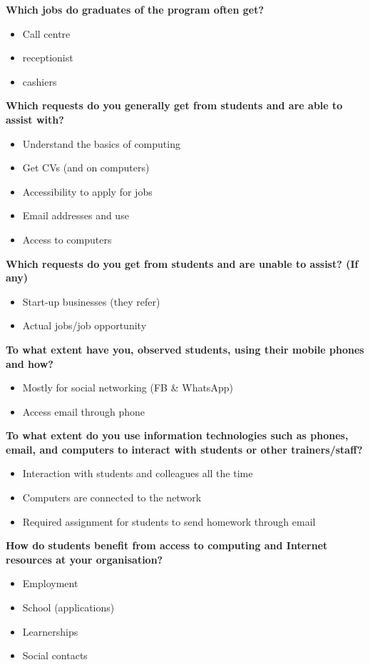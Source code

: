 

\noindent\textbf{Which jobs do graduates of the program often get?}
\begin{itemize}
\item Call centre
\item receptionist
\item cashiers
\end{itemize}

\noindent\textbf{Which requests do you generally get from students and are able to assist with?}
\begin{itemize}
\item Understand the basics of computing
\item Get CVs (and on computers)
\item Accessibility to apply for jobs
\item Email addresses and use
\item Access to computers
\end{itemize}

\noindent\textbf{Which requests do you get from students and are unable to assist? (If any)}
\begin{itemize}
\item Start-up businesses (they refer)
\item Actual jobs/job opportunity
\end{itemize}

\noindent\textbf{To what extent have you, observed students, using their mobile phones and how?}
\begin{itemize}
\item Mostly for social networking (FB \& WhatsApp)
\item Access email through phone
\end{itemize}

\noindent\textbf{To what extent do you use information technologies such as phones, email, and computers to interact with students or other trainers/staff?}
\begin{itemize}
\item Interaction with students and colleagues all the time
\item Computers are connected to the network
\item Required assignment for students to send homework through email
\end{itemize}

\noindent\textbf{How do students benefit from access to computing and Internet resources at your organisation?}
\begin{itemize}
\item Employment
\item School (applications)
\item Learnerships
\item Social contacts
\end{itemize}

